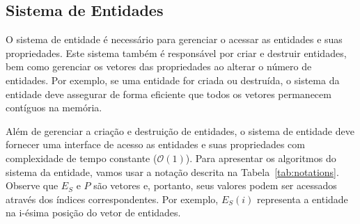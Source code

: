 \subsection{Sistema de Entidades}

O sistema de entidade é necessário para gerenciar o acessar as entidades e suas propriedades. Este sistema também é responsável por criar e destruir entidades, bem como gerenciar os vetores das propriedades ao alterar o número de entidades. Por exemplo, se uma entidade for criada ou destruída, o sistema da entidade deve assegurar de forma eficiente que todos os vetores permanecem contíguos na memória.

Além de gerenciar a criação e destruição de entidades, o sistema de entidade deve fornecer uma interface de acesso as entidades e suas propriedades com complexidade de tempo constante  ($\mathcal{O}(1)$). Para apresentar os algoritmos do sistema da entidade, vamos usar a notação descrita na Tabela~\ref{tab:notations}. Observe que $E_S$ e $P$ são vetores e, portanto, seus valores podem ser acessados através dos índices correspondentes. Por exemplo, $E_S(i)$ representa a entidade na i-ésima posição do vetor de entidades.

\begin{table}[!ht]
\centering
\caption{Notações utilizada no \textit{Entity-Component System} }
\label{tab:notations}
\end{table}

